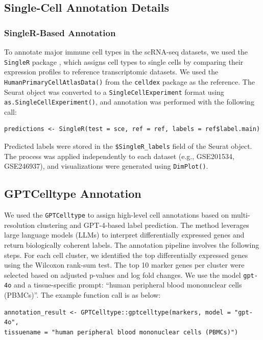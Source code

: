 \documentclass[
  12pt]{article}
\begin{document}
\subsection{Single-Cell Annotation Details}
\subsubsection*{SingleR-Based Annotation}

To annotate major immune cell types in the scRNA-seq datasets, we used the \texttt{SingleR} package \cite{aran2019reference}, which assigns cell types to single cells by comparing their expression profiles to reference transcriptomic datasets. We used the \texttt{HumanPrimaryCellAtlasData()} from the \texttt{celldex} package as the reference. The Seurat object was converted to a \texttt{SingleCellExperiment} format using \texttt{as.SingleCellExperiment()}, and annotation was performed with the following call:

{\small
\begin{verbatim}
predictions <- SingleR(test = sce, ref = ref, labels = ref$label.main)
\end{verbatim}
}

Predicted labels were stored in the \texttt{\$SingleR\_labels} field of the Seurat object. The process was applied independently to each dataset (e.g., GSE201534, GSE246937), and visualizations were generated using \texttt{DimPlot()}.

\subsection*{GPTCelltype Annotation}

We used the \texttt{GPTCelltype} \cite{hou2024gptcelltype} to assign high-level cell annotations based on multi-resolution clustering and GPT-4-based label prediction. The method leverages large language models (LLMs) to interpret differentially expressed genes and return biologically coherent labels. The annotation pipeline involves the following steps. For each cell cluster, we identified the top differentially expressed genes using the Wilcoxon rank-sum test. The top 10 marker genes per cluster were selected based on adjusted p-values and log fold changes. We use the model \texttt{gpt-4o} and a tissue-specific prompt: ``human peripheral blood mononuclear cells (PBMCs)''. The example function call is as below:


{\small
\begin{verbatim}
annotation_result <- GPTCelltype::gptcelltype(markers, model = "gpt-4o", 
tissuename = "human peripheral blood mononuclear cells (PBMCs)")
\end{verbatim}
}
\end{document}

